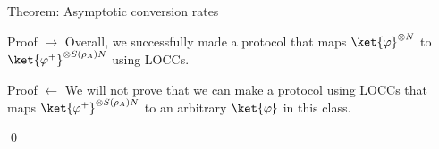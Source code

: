 \documentclass[a4paper]{article}
\begin{document}
\begin{parag}{Theorem: Asymptotic conversion rates}
\begin{subparag}{Proof $\to$}
        Overall, we successfully made a protocol that maps $\ket{\phi}^{\otimes N}$ to $\ket{\phi^+}^{\otimes S\left(\rho_A\right)N}$ using LOCCs. 
    \end{subparag}

    \begin{subparag}{Proof $\leftarrow$}
        We will not prove that we can make a protocol using LOCCs that maps $\ket{\phi^+}^{\otimes S\left(\rho_A\right)N}$ to an arbitrary $\ket{\phi}$ in this class.

        \qed
    \end{subparag}
\end{parag}
 
\end{document}

